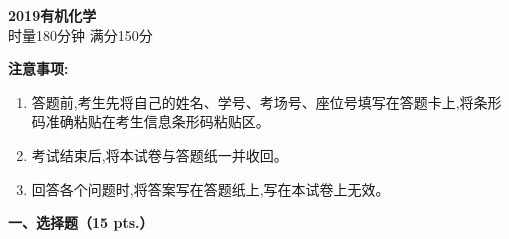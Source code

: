 \begin{center}
    {\LARGE \textbf{2019有机化学}} \\[2ex]
    {\large 时量180分钟 \quad 满分150分}
\end{center}

\vspace{0.5cm}
\noindent\textbf{注意事项:}
\begin{enumerate}[label=\arabic*., parsep=0pt, itemsep=0pt]
    \item 答题前,考生先将自己的姓名、学号、考场号、座位号填写在答题卡上,将条形码准确粘贴在考生信息条形码粘贴区。
    \item 考试结束后,将本试卷与答题纸一并收回。
    \item 回答各个问题时,将答案写在答题纸上,写在本试卷上无效。
\end{enumerate}

\vspace{0.5cm}
\noindent\textbf{一、选择题（15 pts.）}

